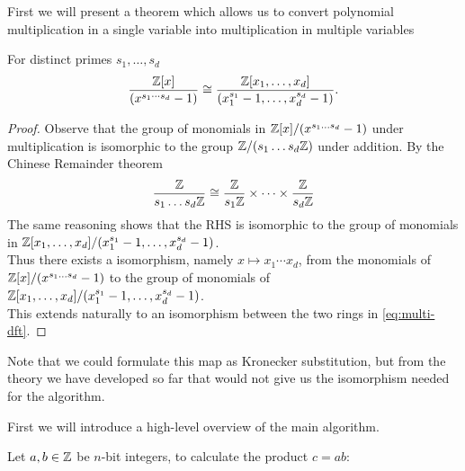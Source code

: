 First we will present a theorem which allows us to convert polynomial multiplication in a single variable into multiplication in multiple variables

\begin{lemma}\label{eq:uni-to-multi}
    For distinct primes $s_1, \ldots, s_d$
    \begin{equation}\label{eq:multi-dft}
        \frac{{\mathbb Z}[x]}{(x^{s_1\cdots s_d} - 1)} \cong \frac{{\mathbb Z}[x_1, \ldots, x_d]}{(x_1^{s_1} - 1, \ldots, x_d^{s_d} - 1)}.
    \end{equation}
\end{lemma}

\begin{proof}
    Observe that the group of monomials in ${\mathbb Z}[x]/(x^{s_1\ldots s_d} - 1)$ under multiplication is isomorphic to the group ${\mathbb Z}/(s_1 \ldots s_d{\mathbb Z})$ under addition. By the Chinese Remainder theorem
    \[
        \frac{{\mathbb Z}}{s_1\ldots s_d {\mathbb Z}} \cong \frac{{\mathbb Z}}{s_1 {\mathbb Z}} \times \cdots \times \frac{{\mathbb Z}}{s_d {\mathbb Z}}
    \]
    The same reasoning shows that the RHS is isomorphic to the group of monomials in ${\mathbb Z}[x_1, \ldots, x_d]/(x_1^{s_1} - 1, \ldots, x_d^{s_d} - 1)$.\\
    Thus there exists a isomorphism, namely $x \mapsto x_1\cdots x_d$, from the monomials of ${\mathbb Z}[x]/(x^{s_1\ldots s_d} - 1)$ to the group of monomials of ${\mathbb Z}[x_1, \ldots, x_d]/(x_1^{s_1} - 1, \ldots, x_d^{s_d} - 1)$.\\
    This extends naturally to an isomorphism between the two rings in \eqref{eq:multi-dft}.
\end{proof}

Note that we could formulate this map as Kronecker substitution, but from the theory we have developed so far that would not give us the isomorphism needed for the algorithm.

First we will introduce a high-level overview of the main algorithm.

Let $a, b \in {\mathbb Z}$ be $n$-bit integers, to calculate the product $c = ab$:


